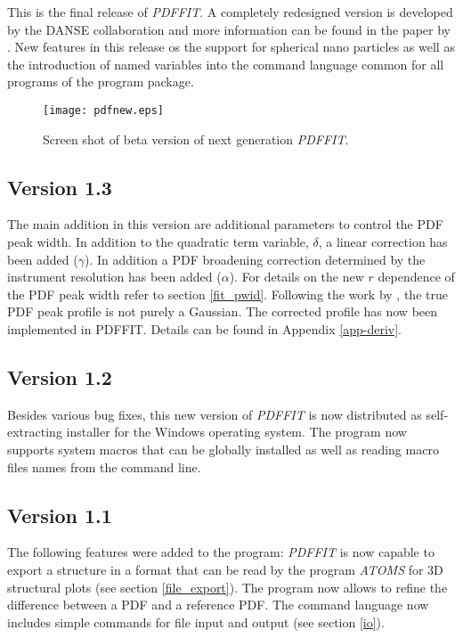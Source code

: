 This is the final release of {\it PDFFIT}. A completely redesigned
version is developed by the DANSE collaboration and more information
can be found in the paper by \cite{fajuli06}. New features in this
release os the support for spherical nano particles as well as the
introduction of named variables into the command language common for
all programs of the program package.

\begin{figure}[!t]
   \centering
   \texttt{[image: pdfnew.eps]}
   \caption{Screen shot of beta version of next generation {\it PDFFIT}.}
\end{figure}


\subsection*{Version 1.3}

The main addition in this version are additional parameters to
control the PDF peak width. In addition to the quadratic term
variable, $\delta$, a linear correction has been added ($\gamma$).
In addition a PDF broadening correction determined by the instrument
resolution has been added ($\alpha$). For details on the new $r$
dependence of the PDF peak width refer to section \ref{fit_pwid}.
Following the work by \cite{thlele02}, the true PDF peak profile is
not purely a Gaussian. The corrected profile has now been
implemented in PDFFIT. Details can be found in Appendix
\ref{app-deriv}.

\subsection*{Version 1.2}

Besides various bug fixes, this new version of {\it PDFFIT} is now
distributed as self-extracting installer for the Windows operating
system. The program now supports system macros that can be
globally installed as well as reading macro files names from the
command line.

\subsection*{Version 1.1}

The following features were added to the program: {\it PDFFIT} is
now capable to export a structure in a format that can be read by
the program {\it ATOMS} \citep{prog;atoms} for 3D structural plots
(see section \ref{file_export}). The program now allows to refine
the difference between a PDF and a reference PDF. The command
language now includes simple commands for file input and output
(see section \ref{io}).

